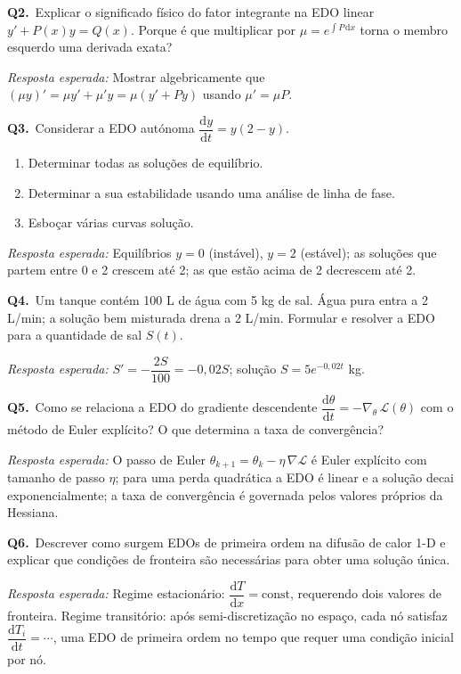 \documentclass[12pt, a4paper]{article}
\newcommand{\dd}{\mathrm{d}}
\begin{document}
\begin{oralbox}
  \textbf{Q2.}\ Explicar o significado físico do fator integrante na EDO linear
  $y' + P(x)y = Q(x)$. Porque é que multiplicar por $\mu = e^{\int P\,\dd x}$ torna
  o membro esquerdo uma derivada exata?

  \medskip
  \textit{Resposta esperada:} Mostrar algebricamente que $(\mu y)' = \mu y' + \mu'y =
  \mu(y'+Py)$ usando $\mu'=\mu P$.
\end{oralbox}

\begin{oralbox}
  \textbf{Q3.}\ Considerar a EDO autónoma $\dfrac{\dd y}{\dd t} = y(2-y)$.
  \begin{enumerate}[label=(\alph*)]
    \item Determinar todas as soluções de equilíbrio.
    \item Determinar a sua estabilidade usando uma análise de linha de fase.
    \item Esboçar várias curvas solução.
  \end{enumerate}
  \textit{Resposta esperada:} Equilíbrios $y=0$ (instável), $y=2$ (estável); as soluções
  que partem entre 0 e 2 crescem até 2; as que estão acima de 2 decrescem até 2.
\end{oralbox}

\begin{oralbox}
  \textbf{Q4.}\ Um tanque contém 100 L de água com 5 kg de sal. Água pura entra a
  2 L/min; a solução bem misturada drena a 2 L/min. Formular e resolver a EDO para a
  quantidade de sal $S(t)$.

  \medskip
  \textit{Resposta esperada:} $S' = -\dfrac{2S}{100} = -0{,}02S$; solução
  $S = 5e^{-0{,}02t}$ kg.
\end{oralbox}

\begin{oralbox}
  \textbf{Q5.}\ Como se relaciona a EDO do gradiente descendente
  $\dfrac{\dd\theta}{\dd t} = -\nabla_{\!\theta}\,\mathcal{L}(\theta)$
  com o método de Euler explícito? O que determina a taxa de convergência?

  \medskip
  \textit{Resposta esperada:} O passo de Euler $\theta_{k+1}=\theta_k -
  \eta\,\nabla\mathcal{L}$ é Euler explícito com tamanho de passo $\eta$; para uma perda
  quadrática a EDO é linear e a solução decai exponencialmente; a taxa de convergência é
  governada pelos valores próprios da Hessiana.
\end{oralbox}

\begin{oralbox}
  \textbf{Q6.}\ Descrever como surgem EDOs de primeira ordem na difusão de calor 1-D e
  explicar que condições de fronteira são necessárias para obter uma solução única.

  \medskip
  \textit{Resposta esperada:} Regime estacionário: $\dfrac{\dd T}{\dd x}=\mathrm{const}$,
  requerendo dois valores de fronteira. Regime transitório: após semi-discretização no
  espaço, cada nó satisfaz $\dfrac{\dd T_i}{\dd t} = \cdots$, uma EDO de primeira ordem
  no tempo que requer uma condição inicial por nó.
\end{oralbox}
\end{document}
